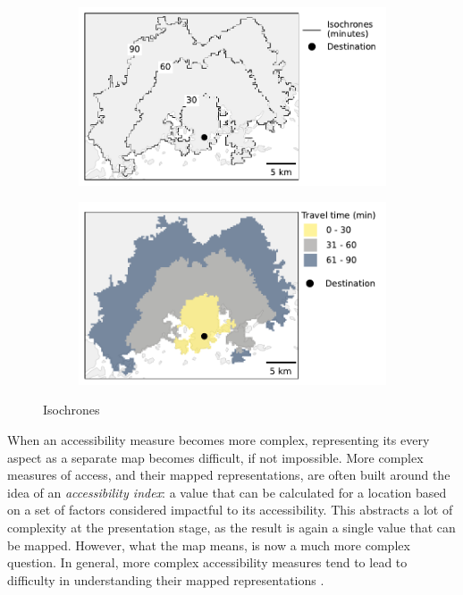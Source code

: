 \begin{figure}[H]
	\centering
	\begin{subfigure}[b]{0.55\textwidth}
		\includegraphics[width=\textwidth]{visual/figures/ttm/isochrone_lines}
		\caption{}
		\label{fig:isochrone lines}
		\hfill
	\end{subfigure}
	\begin{subfigure}[b]{0.55\textwidth}
		\includegraphics[width=\textwidth]{visual/figures/ttm/isochrone_areas}
		\caption{}
		\label{fig:isochrone areas}
		\hfill
	\end{subfigure}
	\caption{Isochrones}
	\label{fig:isochrones}
\end{figure}


When an accessibility measure becomes more complex,
representing its every aspect as a separate map becomes difficult,
if not impossible.
More complex measures of access, and their mapped representations,
are often built around the idea of
an \textit{accessibility index}:
a value that can be calculated for a location
based on a set of factors considered impactful to its accessibility.
This abstracts a lot of complexity at the presentation stage,
as the result is again a single value that can be mapped.
However, what the map means, is now a much more complex question.
In general, more complex accessibility measures tend to lead to
difficulty in understanding their mapped representations \parencite{te2014}.

